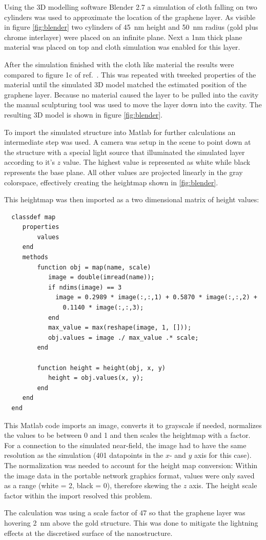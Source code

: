 Using the 3D modelling software Blender 2.7 a simulation of cloth falling on two cylinders was used to approximate the location of the graphene layer. As visible in figure \ref{fig:blender} two cylinders of \SI{45}{nm} height and \SI{50}{nm} radius (gold plus chrome interlayer) were placed on an infinite plane. Next a 1nm thick plane material was placed on top and cloth simulation was enabled for this layer.

After the simulation finished with the cloth like material the results were compared to figure 1c of ref.~\cite{heeg}. This was repeated with tweeked properties of the material until the simulated 3D model matched the estimated position of the graphene layer. Because no material caused the layer to be pulled into the cavity the manual sculpturing tool was used to move the layer down into the cavity. The resulting 3D model is shown in figure \ref{fig:blender}.

To import the simulated structure into Matlab for further calculations an intermediate step was used. A camera was setup in the scene to point down at the structure with a special light source that illuminated the simulated layer according to it's $z$ value. The highest value is represented as white while black represents the base plane. All other values are projected linearly in the gray colorspace, effectively creating the heightmap shown in \ref{fig:blender}.

This heightmap was then imported as a two dimensional matrix of height values:
\begin{verbatim}
  classdef map
     properties
         values
     end
     methods
         function obj = map(name, scale)
            image = double(imread(name));
            if ndims(image) == 3
              image = 0.2989 * image(:,:,1) + 0.5870 * image(:,:,2) +
                0.1140 * image(:,:,3);
            end
            max_value = max(reshape(image, 1, []));
            obj.values = image ./ max_value .* scale;
         end

         function height = height(obj, x, y)
            height = obj.values(x, y);
         end
     end
  end
\end{verbatim}

This Matlab code imports an image, converts it to grayscale if needed, normalizes the values to be between 0 and 1 and then scales the heightmap with a factor. For a connection to the simulated near-field, the image had to have the same resolution as the simulation (401 datapoints in the $x$- and $y$ axis for this case). The normalization was needed to account for the height map conversion: Within the image data in the portable network graphics format, values were only saved as a range (white = 2, black = 0), therefore skewing the $z$ axis. The height scale factor within the import resolved this problem.

The calculation was using a scale factor of $47$ so that the graphene layer was hovering \SI{2}{nm} above the gold structure. This was done to mitigate the lightning effects at the discretised surface of the nanostructure.
